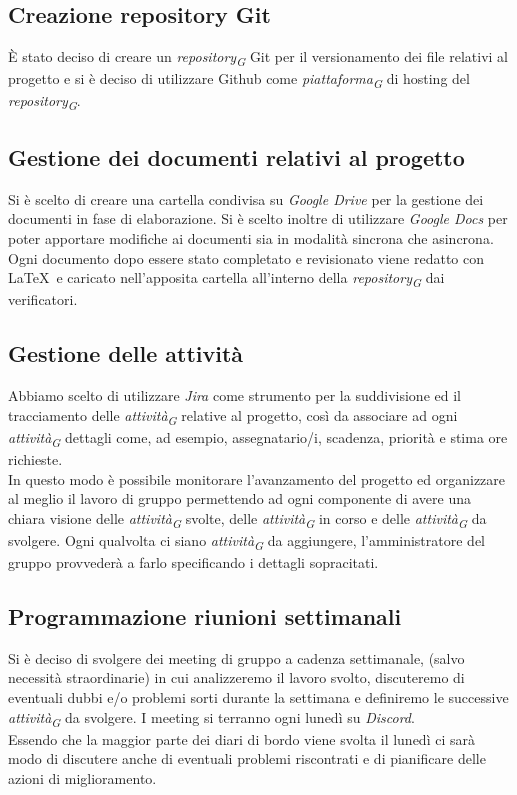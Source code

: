 \documentclass{article}
\begin{document}
    \subsection{Creazione repository Git}
        È stato deciso di creare un \textit{repository}\textsubscript{\textit{G}} Git per il versionamento dei file relativi al progetto e
        si è deciso di utilizzare Github come \textit{piattaforma}\textsubscript{\textit{G}} di hosting del \textit{repository}\textsubscript{\textit{G}}. \subsection{Gestione dei documenti relativi al progetto}
        Si è scelto di creare una cartella condivisa su \textit{Google Drive} per la gestione dei documenti in fase di elaborazione. Si è scelto inoltre di utilizzare \textit{Google Docs} per poter apportare modifiche ai documenti sia in modalità sincrona che asincrona. Ogni documento dopo essere stato completato e revisionato viene redatto con \LaTeX\ e caricato nell’apposita cartella all’interno della \textit{repository}\textsubscript{\textit{G}} dai verificatori. 
    
    \subsection{Gestione delle attività}
        Abbiamo scelto di utilizzare \textit{Jira} come strumento per la suddivisione ed il tracciamento delle \textit{attività}\textsubscript{\textit{G}} relative al progetto, così da associare ad ogni \textit{attività}\textsubscript{\textit{G}} dettagli come, ad esempio, assegnatario/i, scadenza, priorità e stima ore richieste.\\
        In questo modo è possibile monitorare l'avanzamento del progetto ed organizzare al meglio il lavoro di gruppo permettendo ad ogni componente di avere una chiara visione delle \textit{attività}\textsubscript{\textit{G}} svolte, delle \textit{attività}\textsubscript{\textit{G}} in corso e delle \textit{attività}\textsubscript{\textit{G}} da svolgere. 
        Ogni qualvolta ci siano \textit{attività}\textsubscript{\textit{G}} da aggiungere, l’amministratore del gruppo provvederà a farlo specificando i dettagli sopracitati. 
    
    \subsection{Programmazione riunioni settimanali}
        Si è deciso di svolgere dei meeting di gruppo a cadenza settimanale, (salvo necessità straordinarie) in cui analizzeremo il lavoro svolto, discuteremo di eventuali dubbi e/o problemi sorti durante la settimana e definiremo le successive \textit{attività}\textsubscript{\textit{G}} da svolgere.
        I meeting si terranno ogni lunedì su \textit{Discord}.\\
        Essendo che la maggior parte dei diari di bordo viene svolta il lunedì ci sarà modo di discutere anche di eventuali problemi riscontrati e di pianificare delle azioni di miglioramento.
    
\end{document}
